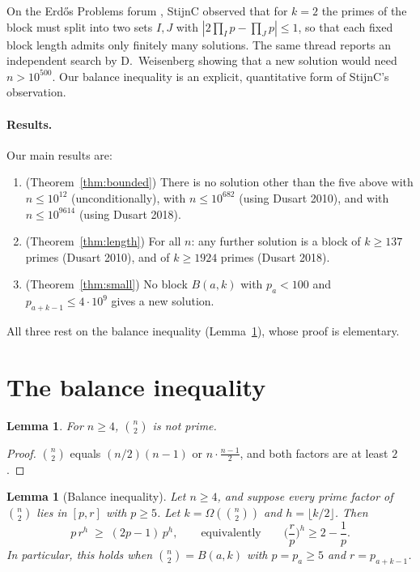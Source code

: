 \documentclass[11pt]{article}
\newtheorem{lemma}[theorem]{Lemma}
\theoremstyle{remark}
\newcommand{\binomtwo}[1]{\binom{#1}{2}}
\begin{document}
On the Erd\H{o}s Problems forum \cite{EPF}, StijnC observed that for $k=2$ the primes of
the block must split into two sets $I, J$ with $|2\prod_I p - \prod_J p| \le 1$, so that each
fixed block length admits only finitely many solutions. The same thread reports an independent
search by D.~Weisenberg showing that a new solution would need $n > 10^{500}$. Our balance
inequality is an explicit, quantitative form of StijnC's observation.

\paragraph{Results.} Our main results are:
\begin{enumerate}
\item (Theorem~\ref{thm:bounded}) There is no solution other than the five above with
  $n \le 10^{12}$ (unconditionally), with $n \le 10^{682}$ (using Dusart 2010), and with
  $n \le 10^{9614}$ (using Dusart 2018).
\item (Theorem~\ref{thm:length}) For all $n$: any further solution is a block of
  $k \ge 137$ primes (Dusart 2010), and of $k \ge 1924$ primes (Dusart 2018).
\item (Theorem~\ref{thm:small}) No block $B(a,k)$ with $p_a < 100$ and
  $p_{a+k-1} \le 4\cdot10^9$ gives a new solution.
\end{enumerate}
All three rest on the balance inequality (Lemma~\ref{lem:balance}), whose proof is
elementary.

\section{The balance inequality}

\begin{lemma}\label{lem:notprime}
For $n \ge 4$, $\binomtwo{n}$ is not prime.
\end{lemma}
\begin{proof}
$\binomtwo{n}$ equals $(n/2)(n-1)$ or $n\cdot\frac{n-1}{2}$, and both factors are at least $2$.
\end{proof}

\begin{lemma}[Balance inequality]\label{lem:balance}
Let $n \ge 4$, and suppose every prime factor of $\binomtwo{n}$ lies in $[p, r]$ with
$p \ge 5$. Let $k = \Omega(\binomtwo{n})$ and $h = \lfloor k/2 \rfloor$. Then
\[
p\, r^{h} \;\ge\; (2p-1)\, p^{h}, \qquad\text{equivalently}\qquad
\Big(\frac{r}{p}\Big)^{h} \ge 2 - \frac1p .
\]
In particular, this holds when $\binomtwo{n} = B(a,k)$ with $p = p_a \ge 5$ and
$r = p_{a+k-1}$.
\end{lemma}
\end{document}
